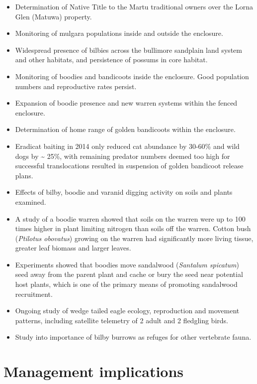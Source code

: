 \documentclass[version=last,
    paper=a4,                               %
    10pt,                                   %
    dvipsnames,
    oneside,                              %
    headings=openany,                       %
    open=any,
    BCOR=7mm,                               %
    DIV=15,     %
]{scrbook}
\begin{document}
\begin{itemize}
\itemsep1pt\parskip0pt
\item
  Determination of Native Title to the Martu traditional owners over the
  Lorna Glen (Matuwa) property.
\item
  Monitoring of mulgara populations inside and outside the enclosure.
\item
  Widespread presence of bilbies across the bullimore sandplain land
  system and other habitats, and persistence of possums in core habitat.
\item
  Monitoring of boodies and bandicoots inside the enclosure. Good
  population numbers and reproductive rates persist.
\item
  Expansion of boodie presence and new warren systems within the fenced
  enclosure.
\item
  Determination of home range of golden bandicoots within the enclosure.
\item
  Eradicat baiting in 2014 only reduced cat abundance by 30-60\% and
  wild dogs by \textasciitilde{} 25\%, with remaining predator numbers
  deemed too high for successful translocations resulted in suspension
  of golden bandicoot release plans.
\item
  Effects of bilby, boodie and varanid digging activity on soils and
  plants examined.
\item
  A study of a boodie warren showed that soils on the warren were up to
  100 times higher in plant limiting nitrogen than soils off the warren.
  Cotton bush (\emph{Ptilotus obovatus}) growing on the warren had
  significantly more living tissue, greater leaf biomass and larger
  leaves.
\item
  Experiments showed that boodies move sandalwood (\emph{Santalum
  spicatum}) seed away from the parent plant and cache or bury the seed
  near potential host plants, which is one of the primary means of
  promoting sandalwood recruitment.
\item
  Ongoing study of wedge tailed eagle ecology, reproduction and movement
  patterns, including satellite telemetry of 2 adult and 2 fledgling
  birds.
\item
  Study into importance of bilby burrows as refuges for other vertebrate
  fauna.
\end{itemize}




\section*{Management implications}
\end{document}
